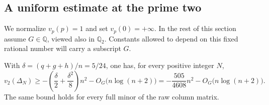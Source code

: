 \subsection{A uniform estimate at the prime two}

We normalize $v_p(p)=1$ and set $v_p(0)=+\infty$.
In the rest of this section assume $G\in\mathbb Q$, viewed also in
$\mathbb Q_2$. Constants allowed to depend on this fixed rational number
will carry a subscript $G$.

\begin{proposition}\label{prop:two-adic}
With $\delta=(q+g+h)/n=5/24$, one has, for every positive integer $N$,
\begin{equation}\label{eq:two-adic-bound}
v_2(\Delta_N)\ge
-\left(\frac{\delta}{2}+\frac{\delta^2}{8}\right)n^2
-O_G\bigl(n\log(n+2)\bigr)
=-\frac{505}{4608}n^2-O_G\bigl(n\log(n+2)\bigr).
\end{equation}
The same bound holds for every full minor of the raw column matrix.
\end{proposition}
